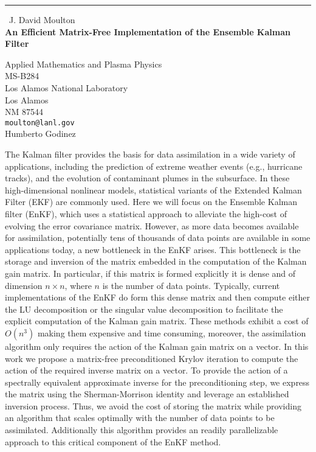 \documentclass{report}
\begin{document}
\begin{center}
\rule{6in}{1pt} \
{\large J. David Moulton \\
{\bf An Efficient Matrix-Free Implementation of the Ensemble Kalman Filter}}

Applied Mathematics and Plasma Physics \\ MS-B284 \\ Los Alamos National Laboratory \\ Los Alamos \\ NM 87544
\\
{\tt moulton@lanl.gov}\\
Humberto Godinez\end{center}

The Kalman filter provides the basis for data assimilation in a wide
variety of applications, including the prediction of extreme weather
events (e.g., hurricane tracks), and the evolution of contaminant plumes
in the subsurface. In these high-dimensional nonlinear models,
statistical variants of the Extended Kalman Filter (EKF) are commonly
used. Here we will focus on the Ensemble Kalman filter (EnKF), which uses
a statistical approach to alleviate the high-cost of evolving the error
covariance matrix. However, as more data becomes available for
assimilation, potentially tens of thousands of data points are
available in some applications today, a new bottleneck in the EnKF
arises. This bottleneck is the storage and inversion of the matrix
embedded in the computation of the Kalman gain matrix. In particular, if
this matrix is formed explicitly it is dense and of dimension $n \times
n$, where $n$ is the number of data points. Typically, current
implementations of the EnKF do form this dense matrix and then compute
either the LU decomposition or the singular value decomposition to
facilitate the explicit computation of the Kalman gain matrix. These
methods exhibit a cost of $O(n^3)$ making them expensive and time
consuming, moreover, the assimilation algorithm only requires the action
of the Kalman gain matrix on a vector. In this work we propose
a matrix-free preconditioned Krylov iteration to compute the action of
the required inverse matrix on a vector. To provide the action of a
spectrally equivalent approximate inverse for the preconditioning step,
we express the matrix using the Sherman-Morrison identity and leverage an
established inversion process. Thus, we avoid the cost of storing the
matrix while providing an algorithm that scales optimally with the number
of data points to be assimilated. Additionally this algorithm provides an
readily parallelizable approach to this critical component of the EnKF
method.
\end{document}

